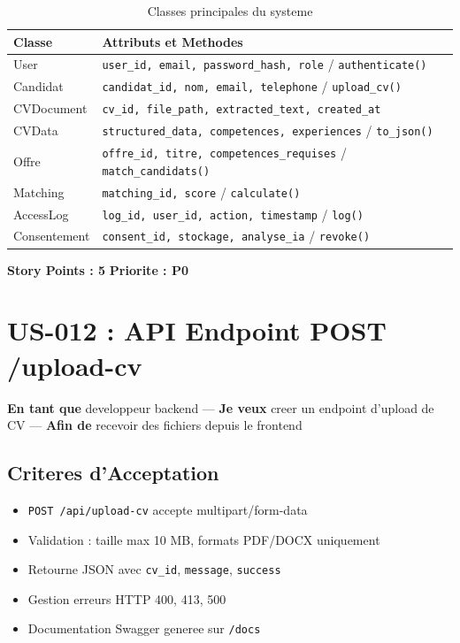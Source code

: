 ﻿\documentclass[12pt,a4paper]{report}
\begin{document}
\begin{table}[H]
\centering
\small
\begin{tabular}{|p{3cm}|p{10cm}|}
\hline
\rowcolor{bleu3S!20}
\textbf{Classe} & \textbf{Attributs et Methodes} \\
\hline
User & \texttt{user\_id, email, password\_hash, role} / \texttt{authenticate()} \\
\hline
Candidat & \texttt{candidat\_id, nom, email, telephone} / \texttt{upload\_cv()} \\
\hline
CVDocument & \texttt{cv\_id, file\_path, extracted\_text, created\_at} \\
\hline
CVData & \texttt{structured\_data, competences, experiences} / \texttt{to\_json()} \\
\hline
Offre & \texttt{offre\_id, titre, competences\_requises} / \texttt{match\_candidats()} \\
\hline
Matching & \texttt{matching\_id, score} / \texttt{calculate()} \\
\hline
AccessLog & \texttt{log\_id, user\_id, action, timestamp} / \texttt{log()} \\
\hline
Consentement & \texttt{consent\_id, stockage, analyse\_ia} / \texttt{revoke()} \\
\hline
\end{tabular}
\caption{Classes principales du systeme}
\end{table}

\textbf{Story Points : 5} \hfill \textbf{Priorite : P0}

\section{US-012 : API Endpoint POST /upload-cv}

\textbf{En tant que} developpeur backend ---
\textbf{Je veux} creer un endpoint d'upload de CV ---
\textbf{Afin de} recevoir des fichiers depuis le frontend

\subsection*{Criteres d'Acceptation}
\begin{itemize}
    \item[\checkmark] \texttt{POST /api/upload-cv} accepte multipart/form-data
    \item[\checkmark] Validation : taille max 10 MB, formats PDF/DOCX uniquement
    \item[\checkmark] Retourne JSON avec \texttt{cv\_id}, \texttt{message}, \texttt{success}
    \item[\checkmark] Gestion erreurs HTTP 400, 413, 500
    \item[\checkmark] Documentation Swagger generee sur \texttt{/docs}
\end{itemize}
\end{document}
